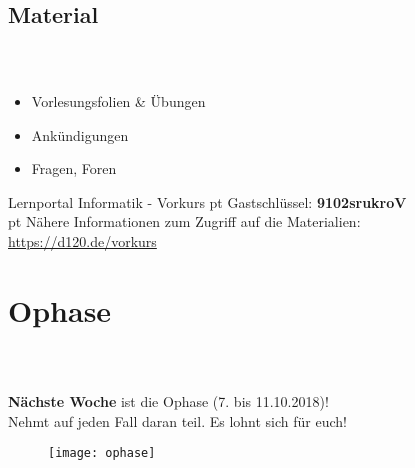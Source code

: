 \subsection{Material}
\begin{frame}
	\frametitle{\insertsectionhead \\ {\small \insertsubsectionhead}}
	\begin{itemize}
		\item Vorlesungsfolien \& Übungen
		\item Ankündigungen
		\item Fragen, Foren
	\end{itemize}

	\begin{block}{Lernportal Informatik - Vorkurs}
		 pt
		\Huge{Gastschlüssel:} \textbf{9102srukroV}\\
		\normalsize
		 pt
		Nähere Informationen zum Zugriff auf die Materialien:\\
		\quad \href{https://d120.de/vorkurs}{https://d120.de/vorkurs}
	\end{block}
\end{frame}

\section{Ophase}
\begin{frame}
	\frametitle{\insertsectionhead \\ {\small \insertsubsectionhead}}
	\textbf{Nächste Woche} ist die Ophase (7. bis 11.10.2018)! \\
	Nehmt auf jeden Fall daran teil. Es lohnt sich für euch!
	\begin{figure}
		\centering
		\texttt{[image: ophase]}
	\end{figure}
\end{frame}


